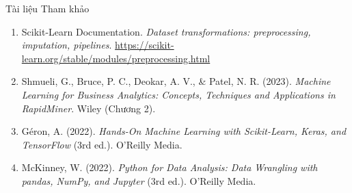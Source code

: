 \documentclass[aspectratio=169,11pt]{beamer}
\begin{document}
\begin{frame}{Tài liệu Tham khảo}
\begin{enumerate}
  \item Scikit-Learn Documentation. \textit{Dataset transformations: preprocessing, imputation, pipelines}. \url{https://scikit-learn.org/stable/modules/preprocessing.html}
  \item Shmueli, G., Bruce, P. C., Deokar, A. V., \& Patel, N. R. (2023). \textit{Machine Learning for Business Analytics: Concepts, Techniques and Applications in RapidMiner}. Wiley (Chương 2).
  \item Géron, A. (2022). \textit{Hands-On Machine Learning with Scikit-Learn, Keras, and TensorFlow} (3rd ed.). O'Reilly Media.
  \item McKinney, W. (2022). \textit{Python for Data Analysis: Data Wrangling with pandas, NumPy, and Jupyter} (3rd ed.). O'Reilly Media.
\end{enumerate}
\end{frame}
\end{document}
